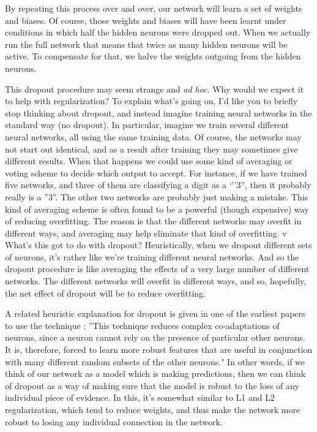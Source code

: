 By repeating this process over and over, our network will learn a set of weights and biases. Of course, those weights and biases will have been learnt under conditions in which half the hidden neurons were dropped out. When we actually run the full network that means that twice as many hidden neurons will be active. To compensate for that, we halve the weights outgoing from the hidden neurons.

This dropout procedure may seem strange and \textit{ad hoc}. Why would we expect it to help with regularization? To explain what's going on, I'd like you to briefly stop thinking about dropout, and instead imagine training neural networks in the standard way (no dropout). In particular, imagine we train several different neural networks, all using the same training data. Of course, the networks may not start out identical, and as a result after training they may sometimes give different results. When that happens we could use some kind of averaging or voting scheme to decide which output to accept. For instance, if we have trained five networks, and three of them are classifying a digit as a `''3'', then it probably really is a ''3''. The other two networks are probably just making a mistake. This kind of averaging scheme is often found to be a powerful (though expensive) way of reducing overfitting. The reason is that the different networks may overfit in different ways, and averaging may help eliminate that kind of overfitting.
v
What's this got to do with dropout? Heuristically, when we dropout different sets of neurons, it's rather like we're training different neural networks. And so the dropout procedure is like averaging the effects of a very large number of different networks. The different networks will overfit in different ways, and so, hopefully, the net effect of dropout will be to reduce overfitting.

A related heuristic explanation for dropout is given in one of the earliest papers to use the technique \cite{Krizhevsky2012}: ''This technique reduces complex co-adaptations of neurons, since a neuron cannot rely on the presence of particular other neurons. It is, therefore, forced to learn more robust features that are useful in conjunction with many different random subsets of the other neurons." In other words, if we think of our network as a model which is making predictions, then we can think of dropout as a way of making sure that the model is robust to the loss of any individual piece of evidence. In this, it's somewhat similar to L1 and L2 regularization, which tend to reduce weights, and thus make the network more robust to losing any individual connection in the network.

